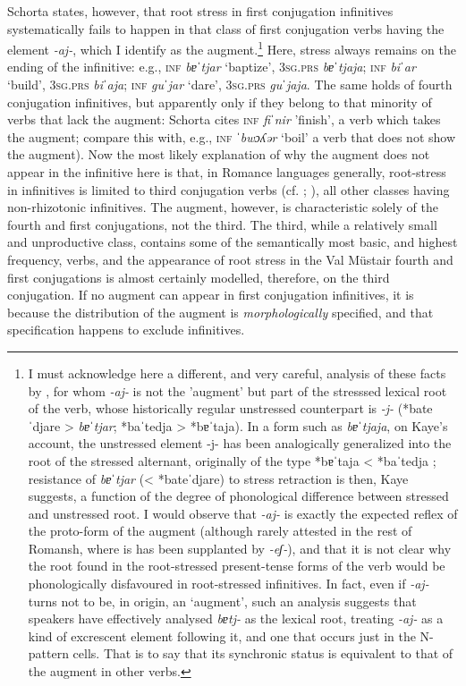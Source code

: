 \documentclass[output=paper,
modfonts
]{LSP/langsci}
\begin{document}
Schorta states, however, that root stress in first conjugation
infinitives systematically fails to happen in that class of first
conjugation verbs having the element \textit{-aj-}, which I identify as the
augment.\footnote{I must acknowledge here a different, and very careful,
  analysis of these facts by \citet*[291--310]{kaye2015}, for whom \textit{-aj-}
  is not the 'augment' but part of the stresssed lexical root of the
  verb, whose historically regular unstressed counterpart is \textit{-j-}
  (*bateˈdjare \textgreater{} \textit{bɐˈtjar}; *baˈtedja \textgreater{}
  *bɐˈtaja). In a form such as \textit{bɐˈtjaja}, on Kaye's account, the
  unstressed element -j- has been analogically generalized into the root
  of the stressed alternant, originally of the type *bɐˈtaja \textless{}
  *baˈtedja \citep[307]{kaye2015}; resistance of \textit{bɐˈtjar} (\textless{}
  *bateˈdjare) to stress retraction is then, Kaye suggests\citeyear[309]{kaye2015}, a
  function of the degree of phonological difference between stressed and
  unstressed root. I would observe that \textit{-aj-} is exactly the expected
  reflex of the proto-form of the augment (although rarely attested in
  the rest of Romansh, where is has been supplanted by \textit{-eʃ-}), and that
  it is not clear why the root found in the root-stressed present-tense
  forms of the verb would be phonologically disfavoured in root-stressed
  infinitives. In fact, even if \textit{-aj-} turns not to be, in origin, an
  `augment', such an analysis suggests that speakers have effectively
  analysed \textit{bɐtj-} as the lexical root, treating \textit{-aj-} as a kind of
  excrescent element following it, and one that occurs just in the
  N-pattern cells. That is to say that its synchronic status is
  equivalent to that of the augment in other verbs.} Here, stress always
remains on the ending of the infinitive: e.g., \textsc{inf} \textit{bɐˈtjar}
`baptize', \textsc{3sg.prs} \textit{bɐˈtjaja}; \textsc{inf} \textit{biˈar} `build',
\textsc{3sg.prs} \textit{biˈaja}; \textsc{inf} \textit{guˈjar} `dare', \textsc{3sg.prs}
\textit{guˈjaja}. The same holds of fourth conjugation infinitives, but
apparently only if they belong to that minority of verbs that lack the
augment: Schorta cites \textsc{inf} \textit{fiˈnir} 'finish', a verb which takes
the augment; compare this with, e.g., \textsc{inf} \textit{ˈbwɔʎər} `boil' a verb
that does not show the augment). Now the most likely explanation of why
the augment does not appear in the infinitive here is that, in Romance
languages generally, root-stress in infinitives is limited to third
conjugation verbs (cf. \citealt[201f.]{maiden2011c}; \citeyear[509]{maiden2016}), all other classes
having non-rhizotonic infinitives. The augment, however, is
characteristic solely of the fourth and first conjugations, not the
third. The third, while a relatively small and unproductive class,
contains some of the semantically most basic, and highest frequency,
verbs, and the appearance of root stress in the Val Müstair fourth and
first conjugations is almost certainly modelled, therefore, on the third
conjugation. If no augment can appear in first conjugation infinitives,
it is because the distribution of the augment is \emph{morphologically}
specified, and that specification happens to exclude infinitives.
\end{document}
